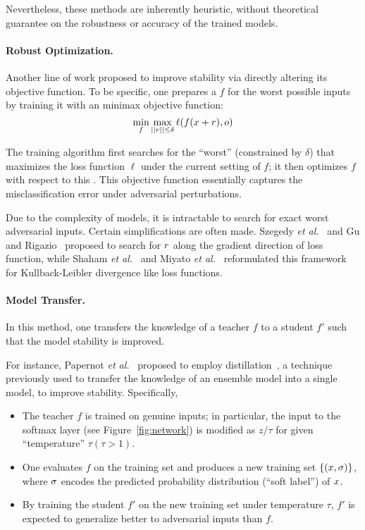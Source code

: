Nevertheless, these methods are inherently heuristic, without theoretical guarantee on the robustness or accuracy of the trained \dnn models.

\paragraph*{Robust Optimization.\;}

Another line of work proposed to improve \dnn stability via directly altering its objective function. To be specific, one prepares a \dnn $f$ for the worst possible inputs by training it with an minimax objective function:
\begin{equation}
    \label{eq:rof}
  \min_f  \max_{ ||r || \leq \delta} \ell(f(x + r), o)
\end{equation}

The training algorithm first searches for the ``worst'' \pv (constrained by $\delta$) that maximizes the loss function $\ell$ under the current setting of $f$; it then optimizes $f$ with respect to this \pv. This objective function essentially captures the misclassification error under adversarial perturbations.

Due to the complexity of \dnn models, it is intractable to search for exact worst adversarial inputs. Certain simplifications are often made. Szegedy {\em et al.}~\cite{Szegedy:2013:arxiv} and Gu and Rigazio~\cite{Gu:2014:arxiv} proposed to search for $r$ along the gradient direction of loss function, while Shaham {\em et al.}~\cite{Shaham:2015:arxiv} and Miyato {\em et al.}~\cite{Miyato:2015:arXiv} reformulated this framework for Kullback-Leibler divergence like loss functions.



\paragraph*{Model Transfer.\;} In this method, one transfers the knowledge of a teacher \dnn $f$ to a student \dnn $f'$ such that the model stability is improved.


For instance, Papernot {\em et al.}~\cite{Papernot:2016:sp} proposed to employ distillation~\cite{Ba:2014:nips,Hinton:2015:arxiv}, a technique previously used to transfer the knowledge of an ensemble model into a single model, to improve \dnn stability. Specifically,
\begin{itemize}
\item The teacher \dnn $f$ is trained on genuine inputs; in particular, the input to the softmax layer (see Figure~\ref{fig:network}) is modified as $z/\tau$  for given ``temperature'' $\tau (\tau > 1)$.
\item One evaluates $f$ on the training set and produces a new training set $\{(x, \sigma)\}$, where $\sigma$ encodes the predicted probability distribution (``soft label'') of $x$.
\item By training the student \dnn $f'$ on the new training set under temperature $\tau$, $f'$ is expected to generalize better to adversarial inputs than $f$.
\end{itemize}



